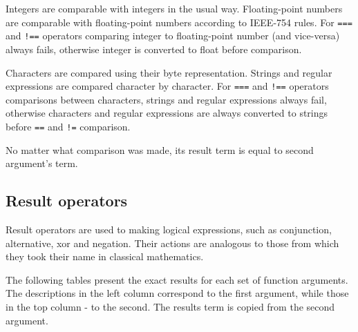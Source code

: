 Integers are comparable with integers in the usual way. Floating-point numbers are comparable with floating-point numbers according to IEEE-754\cite{IEEE754} rules. For \lstinline{===} and \lstinline{!==} operators comparing integer to floating-point number (and vice-versa) always fails, otherwise integer is converted to float before comparison.

Characters are compared using their byte representation. Strings and regular expressions are compared character by character. For \lstinline{===} and \lstinline{!==} operators comparisons between characters, strings and regular expressions always fail, otherwise characters and regular expressions are always converted to strings before \lstinline{==} and \lstinline{!=} comparison.

No matter what comparison was made, its result term is equal to second argument's term.

\subsection{Result operators}

Result operators are used to making logical expressions, such as conjunction, alternative, xor and negation. Their actions are analogous to those from which they took their name in classical mathematics.

The following tables present the exact results for each set of function arguments. The descriptions in the left column correspond to the first argument, while those in the top column - to the second. The results term is copied from the second argument.

